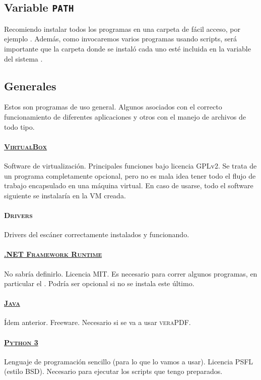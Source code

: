 \documentclass[%
	a5paper,
	10pt,
	twoside,
	openright,
	final,
]{memoir}
\begin{document}
	\subsection{Variable \texttt{PATH}} Recomiendo instalar todos los programas en una carpeta de fácil acceso, por ejemplo . Además, como invocaremos varios programas usando scripts, será importante que la carpeta donde se instaló cada uno esté incluida en la variable  del sistema \cite{WikipediaVariableDeEntorno, SuperUserEnvironment}.

	\subsection{Generales} Estos son programas de uso general. Algunos asociados con el correcto funcionamiento de diferentes aplicaciones y otros con el manejo de archivos de todo tipo.
	\paragraph{\href{https://www.virtualbox.org}{\textsc{VirtualBox}}} Software de virtualización. Principales funciones bajo licencia GPLv2. Se trata de un programa completamente opcional, pero no es mala idea tener todo el flujo de trabajo encapsulado en una máquina virtual. En caso de usarse, todo el software siguiente se instalaría en la VM creada.
	\paragraph{\textsc{Drivers}} Drivers del escáner correctamente instalados y funcionando.
	\paragraph{\href{https://dotnet.microsoft.com}{\textsc{.NET Framework Runtime}}} No sabría definirlo. Licencia MIT. Es necesario para correr algunos programas, en particular el \dexpress. Podría ser opcional si no se instala este último.
	\paragraph{\href{https://www.java.com/es/}{\textsc{Java}}} Ídem anterior. Freeware. Necesario si se va a usar \textsc{veraPDF}.
	\paragraph{\href{https://www.python.org}{\textsc{Python 3}}} Lenguaje de programación sencillo (para lo que lo vamos a usar). Licencia PSFL (estilo BSD). Necesario para ejecutar los scripts que tengo preparados.
\end{document}
